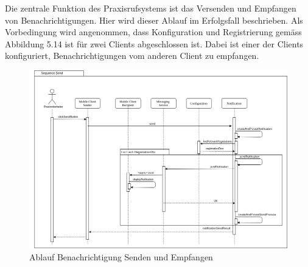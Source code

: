 Die zentrale Funktion des Praxisrufsystems ist das Versenden und Empfangen von Benachrichtigungen.
Hier wird dieser Ablauf im Erfolgsfall beschrieben.
Als Vorbedingung wird angenommen, dass Konfiguration und Registrierung gemäss Abbildung 5.14 ist für zwei Clients abgeschlossen ist.
Dabei ist einer der Clients konfiguriert, Benachrichtigungen vom anderen Client zu empfangen.

\begin{figure}[h]
    \centering
    \begin{minipage}[b]{0.9\textwidth}
        \includegraphics[width=\textwidth]{graphics/Sequence_Notification_Send}
        \caption{Ablauf Benachrichtigung Senden und Empfangen}
    \end{minipage}
\end{figure}


